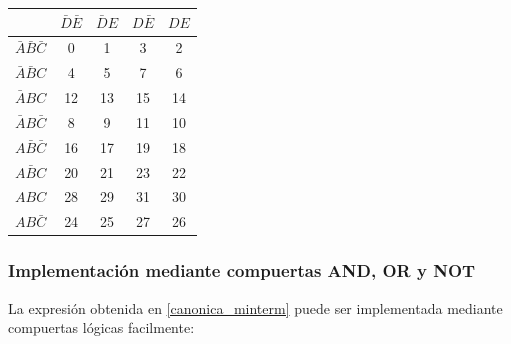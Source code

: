     \begin{table}[H]
        \begin{center}
            \def\arraystretch{1.5}
            \begin{tabular}{|c|c|c|c|c|}
                \hline
                &	$\bar{D}\bar{E}$ &	$\bar{D}E$ &	$D\bar{E}$ & $DE$ \\
                \hline
                $\bar{A}\bar{B}\bar{C}$ & 0 & 1 & 3 & 2 \\
                \hline          
                $\bar{A}\bar{B}C$ & 4 & 5 & 7 & 6 \\
                \hline   
                $\bar{A}BC$ & 12 & 13 & 15 & 14 \\
                \hline     
                $\bar{A}B\bar{C}$  & 8 & 9 & 11 & 10 \\
                \hline
                
                $A\bar{B}\bar{C}$ & 16 & 17 & 19 & 18 \\
                
                \hline
                
                $A\bar{B}C$ & 20 & 21 & 23 & 22 \\
                \hline
                
                $ABC$ & 28 & 29 & 31 & 30 \\
                \hline
                
                $AB\bar{C}$ & 24 & 25 & 27 & 26 \\
                \hline
                
            \end{tabular}
        \end{center}

    \end{table}


\subsubsection{Implementación mediante compuertas AND, OR y NOT}

La expresión obtenida en \ref{canonica_minterm} puede ser implementada mediante compuertas lógicas facilmente:


